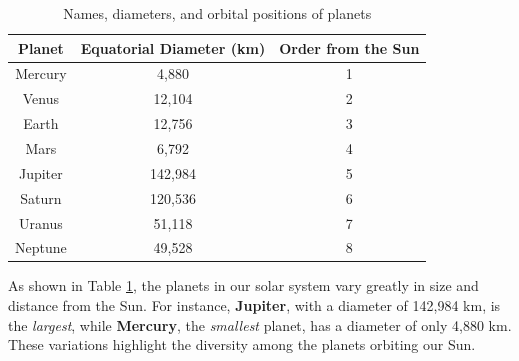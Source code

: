 \documentclass{article}
\begin{document}
\begin{table}[h!]
\centering
\begin{tabular}{|c|c|c|}
\hline
\textbf{Planet} & \textbf{Equatorial Diameter (km)} & \textbf{Order from the Sun} \\ \hline
Mercury & 4,880 & 1 \\ \hline
Venus & 12,104 & 2 \\ \hline
Earth & 12,756 & 3 \\ \hline
Mars & 6,792 & 4 \\ \hline
Jupiter & 142,984 & 5 \\ \hline
Saturn & 120,536 & 6 \\ \hline
Uranus & 51,118 & 7 \\ \hline
Neptune & 49,528 & 8 \\ \hline
\end{tabular}
\caption{Names, diameters, and orbital positions of planets}
\label{tab:planets}
\end{table}




As shown in Table \ref{tab:planets}, the planets in our solar system vary greatly in size and distance from the Sun. For instance, \textbf{Jupiter}, with a diameter of 142,984 km, is the \textit{largest}, while \textbf{Mercury}, the \textit{smallest} planet, has a diameter of only 4,880 km. These variations highlight the diversity among the planets orbiting our Sun.
\end{document}
